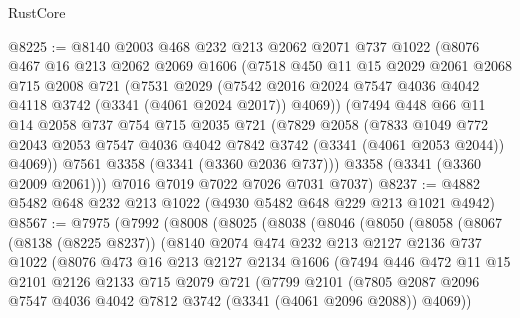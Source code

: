 \begin{lexlean}{RustCore}
\begin{coremodule}
@8225 := @8140
    @2003
    @468
    @232
    @213
    @2062
    @2071
    @737
    @1022
    (@8076
      @467
      @16
      @213
      @2062
      @2069
      @1606
      (@7518
        @450
        @11
        @15
        @2029
        @2061
        @2068
        @715
        @2008
        @721
        (@7531
          @2029
          (@7542 @2016 @2024 @7547 @4036 @4042 @4118 @3742 (@3341 (@4061 @2024 @2017)) @4069))
        (@7494
          @448
          @66
          @11
          @14
          @2058
          @737
          @754
          @715
          @2035
          @721
          (@7829
            @2058
            (@7833
              @1049
              @772
              @2043
              @2053
              @7547
              @4036
              @4042
              @7842
              @3742
              (@3341 (@4061 @2053 @2044))
              @4069))
          @7561
          @3358
          (@3341 (@3360 @2036 @737)))
        @3358
        (@3341 (@3360 @2009 @2061)))
      @7016
      @7019
      @7022
      @7026
      @7031
      @7037)
@8237 := @4882 @5482 @648 @232 @213 @1022 (@4930 @5482 @648 @229 @213 @1021 @4942)
@8567 := @7975
    (@7992
      (@8008
        (@8025
          (@8038
            (@8046
              (@8050
                (@8058
                  (@8067
                    (@8138 (@8225 @8237))
                    (@8140
                      @2074
                      @474
                      @232
                      @213
                      @2127
                      @2136
                      @737
                      @1022
                      (@8076
                        @473
                        @16
                        @213
                        @2127
                        @2134
                        @1606
                        (@7494
                          @446
                          @472
                          @11
                          @15
                          @2101
                          @2126
                          @2133
                          @715
                          @2079
                          @721
                          (@7799
                            @2101
                            (@7805
                              @2087
                              @2096
                              @7547
                              @4036
                              @4042
                              @7812
                              @3742
                              (@3341 (@4061 @2096 @2088))
                              @4069))

\end{coremodule}
\end{lexlean}

